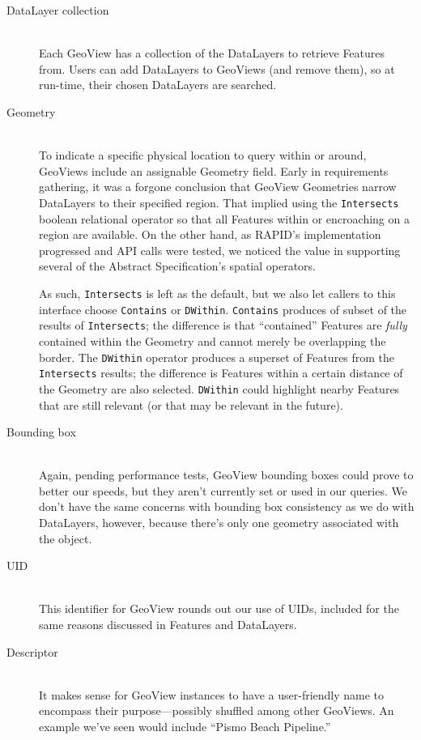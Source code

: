 \begin{description}

\item[DataLayer collection] \hfill \\
Each GeoView has a collection of the DataLayers to retrieve Features from. Users can add DataLayers to GeoViews (and remove them), so at run-time, their chosen DataLayers are searched.

\item[Geometry] \hfill \\
To indicate a specific physical location to query within or around, GeoViews include an assignable Geometry field. Early in requirements gathering, it was a forgone conclusion that GeoView Geometries narrow DataLayers to their specified region. That implied using the \texttt{Intersects} boolean relational operator so that all Features within or encroaching on a region are available. On the other hand, as RAPID's implementation progressed and API calls were tested, we noticed the value in supporting several of the Abstract Specification's spatial operators.

As such, \texttt{Intersects} is left as the default, but we also let callers to this interface choose \texttt{Contains} or \texttt{DWithin}. \texttt{Contains} produces of subset of the results of \texttt{Intersects}; the difference is that ``contained'' Features are \textit{fully} contained within the Geometry and cannot merely be overlapping the border. The \texttt{DWithin} operator produces a superset of Features from the \texttt{Intersects} results; the difference is Features within a certain distance of the Geometry are also selected. \texttt{DWithin} could highlight nearby Features that are still relevant (or that may be relevant in the future).

\item[Bounding box] \hfill \\
Again, pending performance tests, GeoView bounding boxes could prove to better our speeds, but they aren't currently set or used in our queries. We don't have the same concerns with bounding box consistency as we do with DataLayers, however, because there's only one geometry associated with the object.

\item[UID] \hfill \\
This identifier for GeoView rounds out our use of UIDs, included for the same reasons discussed in Features and DataLayers.

\item[Descriptor] \hfill \\
It makes sense for GeoView instances to have a user-friendly name to encompass their purpose---possibly shuffled among other GeoViews. An example we've seen would include ``Pismo Beach Pipeline.''


\end{description}
